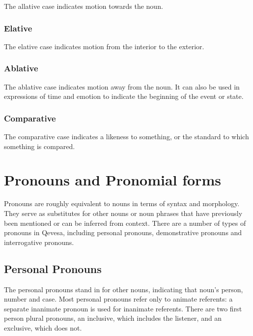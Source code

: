 \documentclass[grammar]{subfiles}
\begin{document}
The allative case indicates motion towards the noun. 


\subsubsection{Elative}
\label{sssec:ns_elative_case}

The elative case indicates motion from the interior to the exterior.


\subsubsection{Ablative}
\label{sssec:ns_ablative_case}

The ablative case indicates motion away from the noun.  It can also be used
in expressions of time and emotion to indicate the beginning of the event or
state. 


\subsubsection{Comparative}
\label{sssec:ns_comparative_case}

The comparative case indicates a likeness to something, or the
standard to which something is compared.



\section{Pronouns and Pronomial forms}
\label{sec:nm_pronouns}

Pronouns are roughly equivalent to nouns in terms of syntax and morphology.
They serve as substitutes for other nouns or noun phrases that have
previously been mentioned or can be inferred from context.  There are a
number of types of pronouns in Qevesa, including personal pronouns,
demonstrative pronouns and interrogative pronouns.



\subsection{Personal Pronouns}
\label{ssec:nm_personal_pronouns}

The personal pronouns stand in for other nouns, indicating that noun's
person, number and case.  Most personal pronouns refer only to animate
referents: a separate inanimate pronoun is used for inanimate referents.
There are two first person plural pronouns, an inclusive, which includes the
listener, and an exclusive, which does not. 
\end{document}
